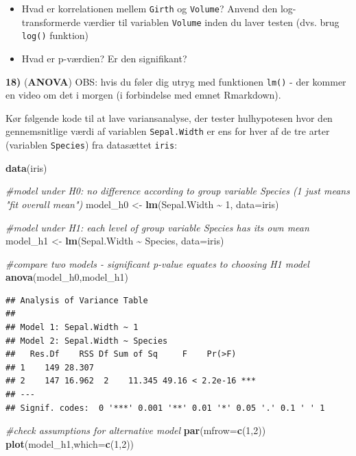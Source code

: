 \documentclass[
]{book}
\newenvironment{Shaded}{\begin{snugshade}}{\end{snugshade}}
\newcommand{\AttributeTok}[1]{\textcolor[rgb]{0.13,0.29,0.53}{#1}}
\newcommand{\CommentTok}[1]{\textcolor[rgb]{0.56,0.35,0.01}{\textit{#1}}}
\newcommand{\DecValTok}[1]{\textcolor[rgb]{0.00,0.00,0.81}{#1}}
\newcommand{\FunctionTok}[1]{\textcolor[rgb]{0.13,0.29,0.53}{\textbf{#1}}}
\newcommand{\NormalTok}[1]{#1}
\newcommand{\OtherTok}[1]{\textcolor[rgb]{0.56,0.35,0.01}{#1}}
\newcommand{\SpecialCharTok}[1]{\textcolor[rgb]{0.81,0.36,0.00}{\textbf{#1}}}
\providecommand{\tightlist}{%
  \setlength{\itemsep}{0pt}\setlength{\parskip}{0pt}}
\begin{document}
\begin{itemize}
\tightlist
\item
  Hvad er korrelationen mellem \texttt{Girth} og \texttt{Volume}? Anvend den log-transformerde værdier til variablen \texttt{Volume} inden du laver testen (dvs. brug \texttt{log()} funktion)
\item
  Hvad er p-værdien? Er den signifikant?
\end{itemize}

\textbf{18)} (\textbf{ANOVA}) OBS: hvis du føler dig utryg med funktionen \texttt{lm()} - der kommer en video om det i morgen (i forbindelse med emnet Rmarkdown).

Kør følgende kode til at lave variansanalyse, der tester hulhypotesen hvor den gennemsnitlige værdi af variablen \texttt{Sepal.Width} er ens for hver af de tre arter (variablen \texttt{Species}) fra datasættet \texttt{iris}:

\begin{Shaded}
\begin{Highlighting}[]
\FunctionTok{data}\NormalTok{(iris)}

\CommentTok{\#model under H0: no difference according to group variable Species (1 just means "fit overall mean")}
\NormalTok{model\_h0 }\OtherTok{\textless{}{-}} \FunctionTok{lm}\NormalTok{(Sepal.Width }\SpecialCharTok{\textasciitilde{}} \DecValTok{1}\NormalTok{, }\AttributeTok{data=}\NormalTok{iris) }

\CommentTok{\#model under H1: each level of group variable Species has its own mean}
\NormalTok{model\_h1 }\OtherTok{\textless{}{-}} \FunctionTok{lm}\NormalTok{(Sepal.Width }\SpecialCharTok{\textasciitilde{}}\NormalTok{ Species, }\AttributeTok{data=}\NormalTok{iris) }

\CommentTok{\#compare two models {-} significant p{-}value equates to choosing H1 model}
\FunctionTok{anova}\NormalTok{(model\_h0,model\_h1)}
\end{Highlighting}
\end{Shaded}

\begin{verbatim}
## Analysis of Variance Table
## 
## Model 1: Sepal.Width ~ 1
## Model 2: Sepal.Width ~ Species
##   Res.Df    RSS Df Sum of Sq     F    Pr(>F)    
## 1    149 28.307                                 
## 2    147 16.962  2    11.345 49.16 < 2.2e-16 ***
## ---
## Signif. codes:  0 '***' 0.001 '**' 0.01 '*' 0.05 '.' 0.1 ' ' 1
\end{verbatim}

\begin{Shaded}
\begin{Highlighting}[]
\CommentTok{\#check assumptions for alternative model}
\FunctionTok{par}\NormalTok{(}\AttributeTok{mfrow=}\FunctionTok{c}\NormalTok{(}\DecValTok{1}\NormalTok{,}\DecValTok{2}\NormalTok{))}
\FunctionTok{plot}\NormalTok{(model\_h1,}\AttributeTok{which=}\FunctionTok{c}\NormalTok{(}\DecValTok{1}\NormalTok{,}\DecValTok{2}\NormalTok{))}
\end{Highlighting}
\end{Shaded}
\end{document}
